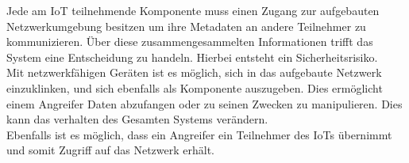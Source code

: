 Jede am \ac{IoT} teilnehmende Komponente muss einen Zugang zur aufgebauten Netzwerkumgebung besitzen um ihre Metadaten an andere Teilnehmer zu kommunizieren. Über diese zusammengesammelten Informationen trifft das System eine Entscheidung zu handeln. Hierbei entsteht ein Sicherheitsrisiko.\\
Mit netzwerkfähigen Geräten ist es möglich, sich in das aufgebaute Netzwerk einzuklinken, und sich ebenfalls als Komponente auszugeben. Dies ermöglicht einem Angreifer Daten abzufangen oder zu seinen Zwecken zu manipulieren. Dies kann das verhalten des Gesamten Systems verändern.\\
Ebenfalls ist es möglich, dass ein Angreifer ein Teilnehmer des \ac{IoT}s übernimmt und somit Zugriff auf das Netzwerk erhält.\\








